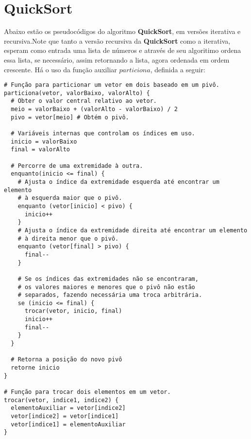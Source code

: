 \section{QuickSort}
Abaixo estão os pseudocódigos do algoritmo \textbf{QuickSort}, em versões iterativa e recursiva.Note que tanto a versão recursiva da \textbf{QuickSort} como a iterativa, esperam como entrada uma lista de números e através de seu algoritimo ordena essa lista, se necessário, assim retornando a lista, agora ordenada em ordem crescente. Há o uso da função auxiliar $particiona$, definida a seguir:
\begin{verbatim}
# Função para particionar um vetor em dois baseado em um pivô.
particiona(vetor, valorBaixo, valorAlto) { 
  # Obter o valor central relativo ao vetor.
  meio = valorBaixo + (valorAlto - valorBaixo) / 2
  pivo = vetor[meio] # Obtém o pivô.

  # Variáveis internas que controlam os índices em uso.
  inicio = valorBaixo
  final = valorAlto 
  
  # Percorre de uma extremidade à outra.
  enquanto(inicio <= final) { 
    # Ajusta o índice da extremidade esquerda até encontrar um elemento 
    # à esquerda maior que o pivô.
    enquanto (vetor[inicio] < pivo) { 
      inicio++
    }
    # Ajusta o índice da extremidade direita até encontrar um elemento 
    # à direita menor que o pivô.
    enquanto (vetor[final] > pivo) {
      final--
    }

    # Se os índices das extremidades não se encontraram, 
    # os valores maiores e menores que o pivô não estão
    # separados, fazendo necessária uma troca arbitrária.
    se (inicio <= final) {
      trocar(vetor, inicio, final)
      inicio++
      final--
    }
  }
  
  # Retorna a posição do novo pivô
  retorne inicio
}
   
# Função para trocar dois elementos em um vetor.
trocar(vetor, indice1, indice2) { 
  elementoAuxiliar = vetor[indice2]
  vetor[indice2] = vetor[indice1]
  vetor[indice1] = elementoAuxiliar
}
\end{verbatim}





